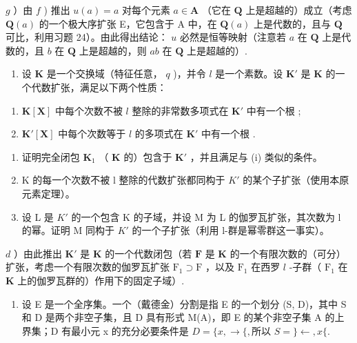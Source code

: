 \(g\) ）由 \(f\) ) 推出 \(u(a) = a\) 对每个元素 \(a \in \mathbf{A}\) （它在 \(\mathbf{Q}\) 上是超越的）成立（考虑 \(\mathbf{Q}(a)\) 的一个极大序扩张 E，它包含于 A 中，在 \(\mathbf{Q}(a)\) 上是代数的，且与 \(\mathbf{Q}\) 可比，利用习题 24）。由此得出结论： \(u\) 必然是恒等映射（注意若 \(a\) 在 \(\mathbf{Q}\) 上是代数的，且 \(b\) 在 \(\mathbf{Q}\) 上是超越的，则 \(ab\) 在 \(\mathbf{Q}\) 上是超越的）.

\begin{enumerate}
\def\labelenumi{\arabic{enumi})}
\setcounter{enumi}{32}
\tightlist
\item
  设 \(\mathbf{K}\) 是一个交换域（特征任意， \(q\) )，并令 \(l\) 是一个素数。设 \(\mathbf{K}'\) 是 \(\mathbf{K}\) 的一个代数扩张，满足以下两个性质：
\end{enumerate}

\begin{enumerate}
\def\labelenumi{(\roman{enumi})}
\item
  \(\mathbf{K}[\mathbf{X}]\) 中每个次数不被 \(l\) 整除的非常数多项式在 \(\mathbf{K}'\) 中有一个根 ;
\item
  \(\mathbf{K}'[\mathbf{X}]\) 中每个次数等于 \(l\) 的多项式在 \(\mathbf{K}'\) 中有一个根 .
\end{enumerate}

\begin{enumerate}
\def\labelenumi{\alph{enumi})}
\item
  证明完全闭包 \(\mathbf{K}_1\) （ \(\mathbf{K}\) 的）包含于 \(\mathbf{K}'\) ，并且满足与 (i) 类似的条件。
\item
  K 的每一个次数不被 l 整除的代数扩张都同构于 \(K'\) 的某个子扩张（使用本原元素定理）。
\item
  设 L 是 \(K'\) 的一个包含 K 的子域，并设 M 为 L 的伽罗瓦扩张，其次数为 l 的幂。证明 M 同构于 \(K'\) 的一个子扩张（利用 l-群是幂零群这一事实）。
\end{enumerate}

\(d\) ）由此推出 \(\mathbf{K}'\) 是 \(\mathbf{K}\) 的一个代数闭包（若 \(\mathbf{F}\) 是 \(\mathbf{K}\) 的一个有限次数的（可分）扩张，考虑一个有限次数的伽罗瓦扩张 \(\mathrm{F}_1\supset \mathrm{F}\) ，以及 \(\mathrm{F}_1\) 在西罗 \(l\) -子群（ \(\mathrm{F}_1\) 在 \(\mathbf{K}\) 上的伽罗瓦群的）作用下的固定子域）.

\begin{enumerate}
\def\labelenumi{\arabic{enumi})}
\setcounter{enumi}{33}
\tightlist
\item
  设 E 是一个全序集。一个（戴德金）分割是指 E 的一个划分 (S, D)，其中 S 和 D 是两个非空子集，且 D 具有形式 M(A)，即 E 的某个非空子集 A 的上界集；D 有最小元 x 的充分必要条件是 \(D = \{x, \rightarrow\{, \text{所以 } S = \} \leftarrow, x\{.\)
\end{enumerate}


